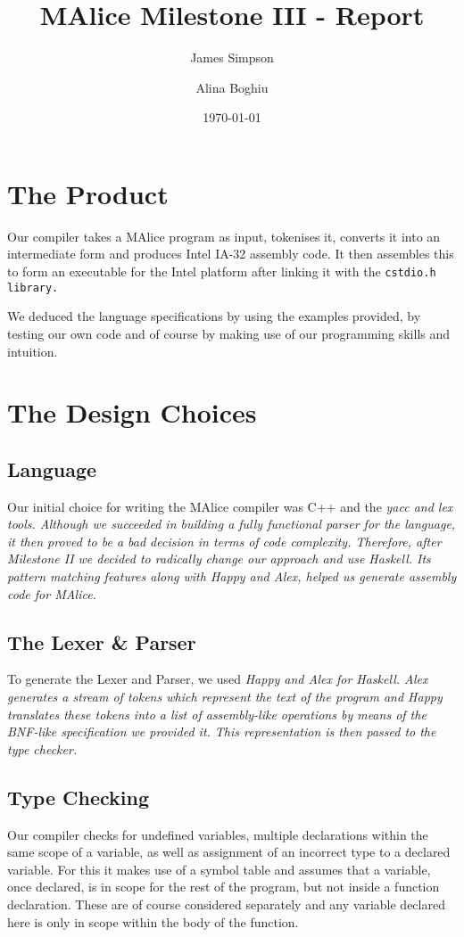 \documentclass[11pt]{article}
\title{MAlice Milestone III - Report}
\author{James Simpson \and Alina Boghiu}
\date{\today}
\begin{document}
\maketitle

\section{The Product}
Our compiler takes a MAlice program as input, tokenises it, converts it into an intermediate form and produces Intel IA-32 assembly code. It then assembles this to form an executable for the Intel platform after linking it with the \tt cstdio.h \rm library.

We deduced the language specifications by using the examples provided, by testing our own code and of course by making use of our programming skills and intuition.

\section{The Design Choices}

\subsection{Language}
Our initial choice for writing the MAlice compiler was C++ and the \sl yacc \rm and \sl lex \rm tools. Although we succeeded in building a fully functional parser for the language, it then proved to be a bad decision in terms of code complexity. Therefore, after Milestone II we decided to radically change our approach and use Haskell. Its pattern matching features along with Happy and Alex, helped us generate assembly code for MAlice.

\subsection{The Lexer \& Parser}
To generate the Lexer and Parser, we used \sl Happy \rm and \sl Alex \rm for Haskell. Alex generates a stream of tokens which represent the text of the program and Happy translates these tokens into a list of assembly-like operations by means of the BNF-like specification we provided it. This representation is then passed to the type checker.

\subsection{Type Checking}
Our compiler checks for undefined variables, multiple declarations within the same scope of a variable, as well as assignment of an incorrect type to a declared variable. For this it makes use of a symbol table and assumes that a variable, once declared, is in scope for the rest of the program, but not inside a function declaration. These are of course considered separately and any variable declared here is only in scope within the body of the function.
\end{document}
